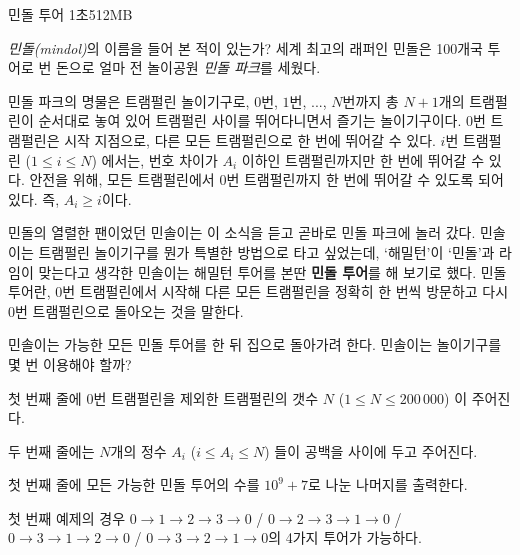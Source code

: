 \begin{problem}{민돌 투어}
{}{}
{1초}{512MB}{}

\textit{민돌(mindol)}의 이름을 들어 본 적이 있는가? 세계 최고의 래퍼인 민돌은 100개국 투어로 번 돈으로 얼마 전 놀이공원 \textit{민돌 파크}를 세웠다.

민돌 파크의 명물은 트램펄린 놀이기구로, $0$번, $1$번, ..., $N$번까지 총 $N+1$개의 트램펄린이 순서대로 놓여 있어 트램펄린 사이를 뛰어다니면서 즐기는 놀이기구이다. $0$번 트램펄린은 시작 지점으로, 다른 모든 트램펄린으로 한 번에 뛰어갈 수 있다. $i$번 트램펄린 ($1 \le i \le N$) 에서는, 번호 차이가 $A_i$ 이하인 트램펄린까지만 한 번에 뛰어갈 수 있다. 안전을 위해, 모든 트램펄린에서 $0$번 트램펄린까지 한 번에 뛰어갈 수 있도록 되어 있다. 즉, $A_i \ge i$이다.

민돌의 열렬한 팬이었던 민솔이는 이 소식을 듣고 곧바로 민돌 파크에 놀러 갔다. 민솔이는 트램펄린 놀이기구를 뭔가 특별한 방법으로 타고 싶었는데,  `해밀턴'이 `민돌'과 라임이 맞는다고 생각한 민솔이는 해밀턴 투어를 본딴 \textbf{민돌 투어}를 해 보기로 했다. 민돌 투어란, $0$번 트램펄린에서 시작해 다른 모든 트램펄린을 정확히 한 번씩 방문하고 다시 $0$번 트램펄린으로 돌아오는 것을 말한다.

민솔이는 가능한 모든 민돌 투어를 한 뒤 집으로 돌아가려 한다. 민솔이는 놀이기구를 몇 번 이용해야 할까?

\InputFile

첫 번째 줄에 $0$번 트램펄린을 제외한 트램펄린의 갯수 $N$ ($1 \le N \le 200\, 000$) 이 주어진다.

두 번째 줄에는 $N$개의 정수 $A_i$ ($i \le A_i \le N$) 들이 공백을 사이에 두고 주어진다.

\OutputFile

첫 번째 줄에 모든 가능한 민돌 투어의 수를 $10^9+7$로 나눈 나머지를 출력한다.

\Examples
	
\begin{example}
%
%
\end{example}

\Note

첫 번째 예제의 경우 $0 \rightarrow 1 \rightarrow 2 \rightarrow 3 \rightarrow 0$ / $0 \rightarrow 2 \rightarrow 3 \rightarrow 1 \rightarrow 0$ / $0 \rightarrow 3 \rightarrow 1 \rightarrow 2 \rightarrow 0$ / $0 \rightarrow 3 \rightarrow 2 \rightarrow 1 \rightarrow 0$의 4가지 투어가 가능하다.

\blankpage

\end{problem}
